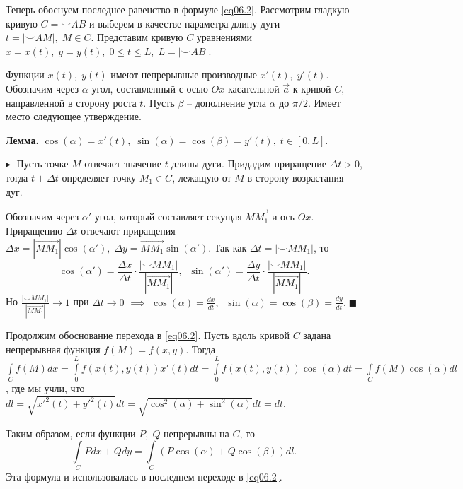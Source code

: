 Теперь обоснуем последнее равенство в формуле \eqref{eq06.2}. Рассмотрим гладкую кривую $C = \smile AB$ и выберем в качестве параметра длину дуги $t = |\smile AM|, \; M \in C$. Представим кривую $C$ уравнениями $x = x(t), \; y = y(t), \; 0 \leq t \leq L, \; L = |\smile AB|$. 

Функции $x(t), \; y(t)$ имеют непрерывные производные $x'(t), \; y'(t)$. Обозначим через $\alpha$ угол, составленный с осью $Ox$ касательной $\overrightarrow{a}$ к кривой $C$, направленной в сторону роста $t$. Пусть $\beta$ -- дополнение угла $\alpha$ до $\pi / 2$. Имеет место следующее утверждение.

\textbf{Лемма.} $\cos(\alpha) = x'(t), \; \sin(\alpha) = \cos(\beta) = y'(t), \; t \in [0, L].$

$\blacktriangleright\;$ Пусть точке $M$ отвечает значение $t$ длины дуги. Придадим приращение $\Delta t > 0$, тогда $t + \Delta t$ определяет точку $M_1 \in C$, лежащую от $M$ в сторону возрастания дуг. 

Обозначим через $\alpha'$ угол, который составляет секущая $\overrightarrow{M M_1}$ и ось $Ox$. Приращению $\Delta t$ отвечают приращения $\Delta x = |\overrightarrow{M M_1}| \cos(\alpha'), \; \Delta y = \overrightarrow{M M_1} \sin(\alpha')$. Так как $\Delta t = |\smile MM_1|$, то 
$$
\cos(\alpha') = \frac{\Delta x}{\Delta t} \cdot \frac{|\smile MM_1|}{|\overrightarrow{M M_1}|}, \;\; \sin(\alpha') = \frac{\Delta y}{\Delta t} \cdot \frac{|\smile MM_1|}{|\overrightarrow{M M_1}|}.
$$
Но $\frac{|\smile MM_1|}{|\overrightarrow{M M_1}|} \to 1$ при $\Delta t \to 0$ $\implies$
$\cos(\alpha) = \frac{dx}{dt}, \;\; \sin(\alpha) = \cos(\beta) = \frac{dy}{dt}.
\; \blacksquare$

Продолжим обоснование перехода в \eqref{eq06.2}. Пусть вдоль кривой $C$ задана непрерывная функция $f(M) = f(x,y)$. Тогда $\int\limits_C f(M) dx = \int\limits_0^L f(x(t), y(t)) x'(t) dt = \int\limits_0^L f(x(t), y(t)) \cos(\alpha) dt = \int\limits_C f(M) \cos(\alpha) dl$, где мы учли, что $dl = \sqrt{x'^2(t) + y'^2(t)} dt = \sqrt{\cos^2(\alpha) + \sin^2(\alpha)}dt = dt$. 

Таким образом, если функции $P,\; Q$ непрерывны на $C$, то 
$$
\int\limits_C P dx + Q dy = \int\limits_C (P \cos(\alpha) + Q \cos(\beta)) dl.
$$
Эта формула и использовалась в последнем переходе в \eqref{eq06.2}.



